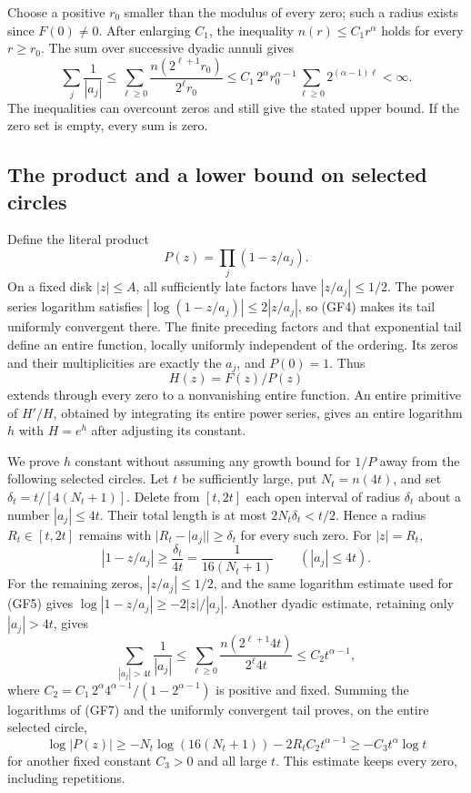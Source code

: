 \documentclass{article}
\begin{document}
Choose a positive $r_0$ smaller than the modulus of every zero;
such a radius exists since $F(0)\ne0$. After enlarging $C_1$,
the inequality $n(r)\le C_1r^\alpha$ holds for every $r\ge r_0$.
The sum over successive dyadic annuli gives
\[
\sum_j\frac1{|a_j|}
\le\sum_{\ell\ge0}
\frac{n(2^{\ell+1}r_0)}{2^\ell r_0}
\le C_1\,2^\alpha r_0^{\alpha-1}
\sum_{\ell\ge0}2^{(\alpha-1)\ell}<\infty.
\tag{GF4}
\]
The inequalities can overcount zeros and still give the stated
upper bound. If the zero set is empty, every sum is zero.

\subsection{The product and a lower bound on selected circles}
Define the literal product
\[
P(z)=\prod_j(1-z/a_j).
\tag{GF5}
\]
On a fixed disk $|z|\le A$, all sufficiently late factors have
$|z/a_j|\le1/2$. The power series logarithm satisfies
$|\log(1-z/a_j)|\le2|z/a_j|$, so (GF4) makes its tail uniformly
convergent there. The finite preceding factors and that exponential
tail define an entire function, locally uniformly independent of
the ordering. Its zeros and their multiplicities are exactly the
$a_j$, and $P(0)=1$. Thus
\[
H(z)=F(z)/P(z)
\tag{GF6}
\]
extends through every zero to a nonvanishing entire function.
An entire primitive of $H'/H$, obtained by integrating its entire
power series, gives an entire logarithm $h$ with $H=e^h$ after
adjusting its constant.

We prove $h$ constant without assuming any growth bound for
$1/P$ away from the following selected circles. Let $t$ be
sufficiently large, put $N_t=n(4t)$, and set
$\delta_t=t/[4(N_t+1)]$. Delete from $[t,2t]$ each open interval
of radius $\delta_t$ about a number $|a_j|\le4t$.
Their total length is at most $2N_t\delta_t<t/2$.
Hence a radius $R_t\in[t,2t]$ remains with
$|R_t-|a_j||\ge\delta_t$ for every such zero. For $|z|=R_t$,
\[
|1-z/a_j|\ge\frac{\delta_t}{4t}
=\frac1{16(N_t+1)}\qquad(|a_j|\le4t).
\tag{GF7}
\]
For the remaining zeros, $|z/a_j|\le1/2$, and the same logarithm
estimate used for (GF5) gives
$\log|1-z/a_j|\ge-2|z|/|a_j|$.
Another dyadic estimate, retaining only $|a_j|>4t$, gives
\[
\sum_{|a_j|>4t}\frac1{|a_j|}
\le\sum_{\ell\ge0}
\frac{n(2^{\ell+1}4t)}{2^\ell4t}
\le C_2t^{\alpha-1},
\tag{GF8}
\]
where $C_2=C_1\,2^\alpha4^{\alpha-1}/(1-2^{\alpha-1})$
is positive and fixed. Summing the logarithms of (GF7) and the
uniformly convergent tail proves, on the entire selected circle,
\[
\log|P(z)|
\ge-N_t\log(16(N_t+1))-2R_tC_2t^{\alpha-1}
\ge-C_3t^\alpha\log t
\tag{GF9}
\]
for another fixed constant $C_3>0$ and all large $t$.
This estimate keeps every zero, including repetitions.
\end{document}
